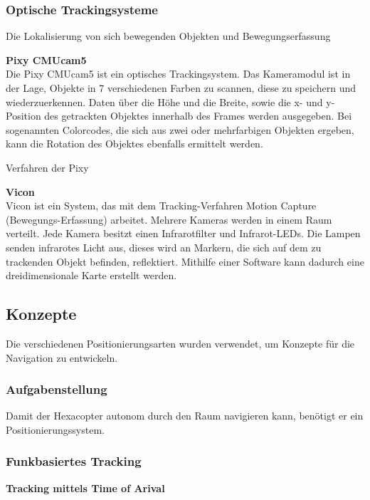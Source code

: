     \subsubsection{Optische Trackingsysteme}

    Die Lokalisierung von sich bewegenden Objekten und Bewegungserfassung

    \textbf{Pixy CMUcam5}\\
    Die Pixy CMUcam5 ist ein optisches Trackingsystem. Das Kameramodul ist in der Lage, Objekte in 7 verschiedenen Farben zu scannen, diese zu speichern und wiederzuerkennen. Daten über die Höhe und die Breite, sowie die x- und y-Position des getrackten Objektes innerhalb des Frames werden ausgegeben. Bei sogenannten Colorcodes, die sich aus zwei oder mehrfarbigen Objekten ergeben, kann die Rotation des Objektes ebenfalls ermittelt werden.

    Verfahren der Pixy

    \cite{Pixy}
    \cite{Pixy_Verfahren}
    \cite{Pixy_Verfahren2}

    \textbf{Vicon}\\
    Vicon ist ein System, das mit dem Tracking-Verfahren Motion Capture (Bewegungs-Erfassung) arbeitet. 
    Mehrere Kameras werden in einem Raum verteilt. Jede Kamera besitzt einen Infrarotfilter und Infrarot-LEDs. Die Lampen senden infrarotes Licht aus, dieses wird an Markern, die sich auf dem zu trackenden Objekt befinden, reflektiert. Mithilfe einer Software kann dadurch eine dreidimensionale Karte erstellt werden.
    \cite{Vicon}

  \subsection{Konzepte}
  Die verschiedenen Positionierungsarten wurden verwendet, um Konzepte für die Navigation zu entwickeln.

    \subsubsection{Aufgabenstellung}
    Damit der Hexacopter autonom durch den Raum navigieren kann, benötigt er ein Positionierungssystem.

    \subsubsection{Funkbasiertes Tracking}

      \textbf{Tracking mittels Time of Arival}\\

